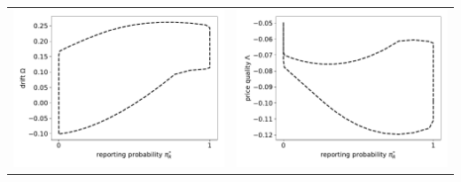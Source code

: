 \documentclass{article}
\begin{document}
\begin{tabular}{cc}
	\includegraphics[scale=.5]{reporting_probability_drift} & \includegraphics[scale=.5]{reporting_probability_price_quality} 
\end{tabular}
\end{document}
